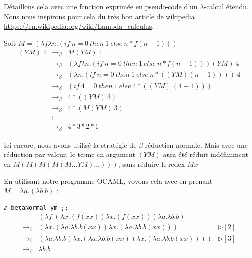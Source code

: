 Détaillons cela avec une fonction exprimée en pseudo-code d'un $\lambda$-calcul étendu.
Nous nous inspirons pour cela du très bon article de wikipedia \url{https://en.wikipedia.org/wiki/Lambda_calculus}.


Soit $M = (\lambda f \lambda n .(if\ n=0\ then\ 1\ else\ n*f(n-1)))$
$$
\begin{array}{lll}
(YM)\ 4 & \rightarrow _\beta & M (YM)\ 4 \\
& \rightarrow _\beta & (\lambda f \lambda n .(if\ n=0\ then\ 1\ else\ n*f(n-1))) (YM)\ 4 \\
& \rightarrow _\beta & (\lambda  n . (if\ n=0\ then\ 1\ else\ n*((YM) (n-1))))\ 4 \\
& \rightarrow _\beta & (if\ 4=0\ then\ 1\ else\ 4*((YM)\ (4-1))) \\
& \rightarrow _\beta & 4 * ((YM)\ 3) \\
& \rightarrow _\beta & 4 * (M(YM)\ 3) \\
& \vdots & \\
& \rightarrow _\beta & 4 * 3 * 2 * 1 
\end{array}
$$

Ici encore, nous avons utilisé la stratégie de $\beta$-réduction normale. 
Mais avec une réduction par valeur, le terme en argument $(YM)$ aura été réduit indéfiniment en $M(M(M(M(M\ldots YM)\ldots)))$,
sans réduire le redex $Mx$


En utilisant notre programme OCAML, voyons cela avec en prenant $M = \lambda a. (\lambda b . b) $ :

\texttt{\# betaNormal ym ;;}
$$
\begin{array}{lll}
 & (\lambda f . (\lambda x . (f(xx))\lambda x . (f(xx)))\lambda a . \lambda b . b) &  \\
 \rightarrow _\beta & (\lambda x . (\lambda a . \lambda b . b(xx))\lambda x . (\lambda a . \lambda b . b(xx))) &\triangleright [2]  \\
 \rightarrow _\beta & (\lambda a . \lambda b . b(\lambda x . (\lambda a . \lambda b . b(xx))\lambda x . (\lambda a . \lambda b . b(xx))))  &\triangleright [3]  \\
 \rightarrow _\beta & \lambda b . b &  \\
\end{array}
$$

